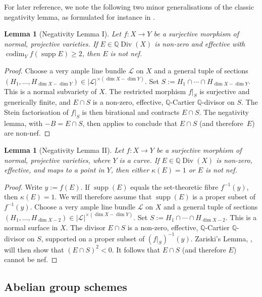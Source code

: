 \documentclass[JEP,XML,SOM,Unicode,published]{cedram}
\let\scr\mathscr
\theoremstyle{plain}
\newtheorem{lem}[thm]{Lemma}
\theoremstyle{definition}
\numberwithin{equation}{thm}
\numberwithin{enumi}{thm}
\DeclareMathOperator{\codim}{codim}
\DeclareMathOperator{\supp}{supp}
\DeclareMathOperator{\Div}{Div}
\newcommand{\sL}{\scr{L}}
\newcommand{\bQ}{\mathbb{Q}}
\begin{document}
For later reference, we note the following two minor generalisations of the
classic negativity lemma, as formulated for instance in
\cite[Lem.\,3.39--3.41]{KM98}.

\begin{lem}[Negativity Lemma I]\label{lem:negativity1}
Let $f : X \to Y$ be a surjective morphism of normal, projective varieties. If
$E \in \bQ\Div(X)$ is non-zero and effective with $\codim_Y f(\supp E) \geq 2$, then
$E$ is not nef.
\end{lem}
\begin{proof}
Choose a very ample line bundle $\sL$ on $X$ and a general tuple of sections
$(H_1, \dots, H_{\dim X-\dim Y}) \in |\sL|^{\times (\dim X-\dim Y)}$. Set
$S := H_1 \cap\cdots\cap H_{\dim X-\dim Y}$. This is a normal subvariety of $X$. The
restricted morphism $f|_S$ is surjective and generically finite, and $E \cap S$
is a non-zero, effective, $\bQ$-Cartier $\bQ$-divisor on $S$. The Stein
factorisation of $f|_S$ is then birational and contracts $E \cap S$. The
negativity lemma, \cite[Lem.\,3.39(1)]{KM98} with $-B = E \cap S$, then applies to
conclude that $E \cap S$ (and therefore~$E$) are non-nef.
\end{proof}

\begin{lem}[Negativity Lemma II]\label{lem:negativity2}
Let $f : X \to Y$ be a surjective morphism of normal, projective varieties, where
$Y$ is a curve. If $E \in \bQ\Div(X)$ is non-zero, effective, and maps to a point
in $Y$, then either $\kappa(E) = 1$ or $E$ is not nef.
\end{lem}
\begin{proof}
Write $y := f(E)$. If $\supp(E)$ equals the set-theoretic fibre $f^{-1}(y)$,
then $\kappa(E) = 1$. We will therefore assume that $\supp(E)$ is a proper subset
of $f^{-1}(y)$. Choose a very ample line bundle $\sL$ on $X$ and a general
tuple of sections $(H_1, \dots, H_{\dim X-2}) \in |\sL|^{\times (\dim X-\dim Y)}$. Set
$S := H_1 \cap\cdots\cap H_{\dim X-2}$. This is a normal surface in $X$. The divisor
$E \cap S$ is a non-zero, effective, $\bQ$-Cartier $\bQ$-divisor on $S$, supported on
a proper subset of $(f|_S)^{-1}(y)$. Zariski's Lemma, \cite[Chap.\,III,
Lem.\,8.2]{HBPV}, will then show that $(E \cap S)^2 < 0$. It follows that $E \cap S$
(and therefore $E$) cannot be nef.
\end{proof}

\subsection{Abelian group schemes}
\end{document}
